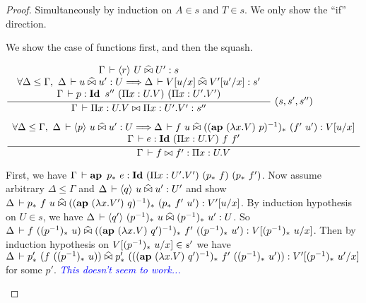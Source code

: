 \documentclass[a4paper,english]{lipics-utf8x}
\newcommand\meta[1]{\noindent\textcolor{blue}{\emph{#1}}}
\begin{document}
  \begin{proof}
    Simultaneously by induction on $A \in s$ and $T \in s$.
    We only show the ``if'' direction.

    We show the case of functions first, and then the squash.

    \begin{caselist}
      \nextcase
      \begin{center}
      \(
        \trux{\Gamma \der \hideq{r} U \hEr U' : s
            }{\forall \Delta \le \Gamma,\ \Delta \der u \hEr u' : U \gives
              \Delta \der V[u/x] \hEr V'[u'/x] : s'
            }{\Gamma \der p : \Id s''\ (\Pi x:U.V)\ (\Pi x:U'.V')
            }{\Gamma \der \Pi x:U.V \Er \Pi x:U'.V' : s''
            }{(s,s',s'')}
      \)
      \end{center}
      \begin{center}
      \(
        \dru{\forall \Delta \le \Gamma,\ \Delta \der \hideq{p} u \hEr u' : U
             \gives
             \Delta \der f~u \hEr ((\ap (\lambda x.V)\ p)\inv)_*\ (f'~u') :
             V[u/x]
           }{\Gamma \der e : \Id (\Pi x:U.V)\ f\ f'
           }{\Gamma \der f \Er f' : \Pi x:U.V}
      \)
      \end{center}
      First, we have
      $\Gamma \,\vdash \operatorname{\mathbf{ap}~} p_*\ e : \operatorname{\mathbf{Id}~} (\Pi x:U'.V')\ (p_*\ f)\ (p_*\ f')$.
      Now assume arbitrary $\Delta \le \Gamma$ and
      $\Delta \,\vdash \langle q \rangle~ u \mathrel{\widehat{\bowtie}} u' : U'$ and show
      $\Delta \,\vdash p_*\ f\ u \mathrel{\widehat{\bowtie}} ((\operatorname{\mathbf{ap}~} (\lambda x.V')\ q)^{-1})_*\ (p_*\ f'\ u')
      : V'[u/x]$.
      By induction hypothesis on $U \in s$, we have
      $\Delta \,\vdash \langle q' \rangle~ (p^{-1})_*\ u \mathrel{\widehat{\bowtie}} (p^{-1})_*\ u' : U$.
      So
      $\Delta \,\vdash f\ ((p^{-1})_*\ u) \mathrel{\widehat{\bowtie}}
      ((\operatorname{\mathbf{ap}~} (\lambda x.V)\ q')^{-1})_*\ f'\ ((p^{-1})_*\ u') : V[(p^{-1})_*\ u/x]$.
      Then by induction hypothesis on $V[(p^{-1})_*\ u/x] \in s'$ we have
      $\Delta \der p'_*\ (f\ ((p\inv)_*\ u)) \hEr p'_*\ %
      (((\ap (\lambda x.V)\ q')\inv)_*\ f'\ ((p\inv)_*\ u')) :
      V'[(p\inv)_*\ u'/x]$ for some $p'$.
      \meta{This doesn't seem to work...}

    \end{caselist}
  \end{proof}
\end{document}
